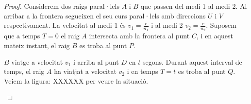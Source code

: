 \documentclass{article}
\begin{document}
\begin{proof}
   Considerem dos raigs paral·lels $A$ i $B$ que passen del medi 1 al medi 2. Al arribar a la frontera segueixen el seu curs
   paral·lels amb direccions $U$ i  $V$ respectivament. La velocitat al medi 1 és $v_1=\frac{c}{n_1}$ i al medi 2 $v_2=\frac{c}{n_2}$.
   Suposem que a temps  $T=0$ el raig  $A$ intersecta amb la frontera al punt  $C$, i en aquest mateix instant, el raig  $B$ es
   troba al punt  $P$.

   $B$ viatge a velocitat  $v_1$ i arriba al punt $D$ en  $t$ segons. Durant aquest interval de temps, el raig $A$ ha viatjat a
   velocitat  $v_2$ i en temps $T=t$ es troba al punt  $Q$.
   Veiem la figura: XXXXXX per veure la situació.
   \begin{figure}[h]
      \centering
{} %

\begin{tikzpicture}[x=0.75pt,y=0.75pt,yscale=-1,xscale=1]


\end{tikzpicture}
\end{figure}
\end{proof}
\end{document}
